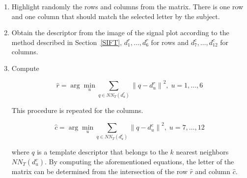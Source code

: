 \documentclass[entropy,article,submit,moreauthors,pdftex,10pt,a4paper]{mdpi}
\begin{document}
\begin{enumerate}
\item Highlight randomly the rows and columns from the matrix.  There is one row and one column that should match the selected letter by the subject.
\item Obtain the descriptor from the image of the signal plot according to the method described in Section~\ref{SIFT}, $ d^r_1, \dots,  d^r_6 $ for rows and  $ d^c_7, \dots,  d^c_{12} $ for columns. 
\item Compute  

\begin{equation}
\hat{r} = \arg \min_u \sum_{q \in NN_T(d^r_u)}^{} \left\lVert q -  d^r_u \right\rVert ^2,\; u = 1,\dots,6
\label{eq:multiclassificationrow}
\end{equation}

\noindent This procedure is repeated for the columns.

\begin{equation}
\hat{c} = \arg \min_u \sum_{q \in NN_T(d^c_u)}^{} \left\lVert q -  d^c_u \right\rVert ^2,\; u = 7,\dots,12
\label{eq:multiclassificationcol}
\end{equation}

where $q$ is a template descriptor that belongs to the $k$ nearest neighbors  $NN_T(d^c_u)$.  By computing the aforementioned equations, the letter of the matrix can be determined from the intersection of the row $ \hat{r} $ and column $ \hat{c} $.


\end{enumerate}
\end{document}
